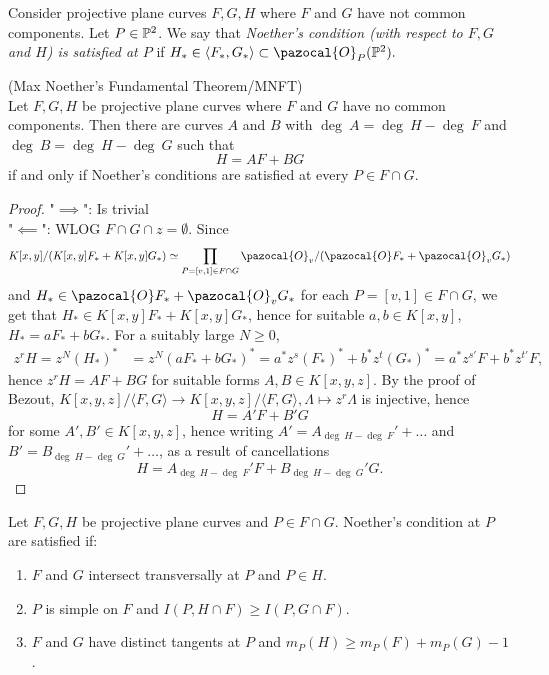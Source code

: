     \begin{definition}
        Consider projective plane curves $F,G,H$ where $F$ and $G$ have not common components. Let $P\in\mathbb{P}^2$. We say that \textit{Noether's condition (with respect to $F,G$ and $H$) is satisfied at $P$} if $H_\ast \in \langle F_\ast,G_\ast\rangle \subset \pazocal{O}_P(\Pp^2).$
    \end{definition}
    \begin{theorem}\label{MaxNoethersFundamentalTheorem}(Max Noether's Fundamental Theorem/MNFT)\\
        Let $F,G,H$ be projective plane curves where $F$ and $G$ have no common components. Then there are curves $A$ and $B$ with $\deg \ A = \deg \ H-\deg \ F$ and $\deg \ B = \deg \ H -\deg \ G$ such that 
        $$ H= AF+BG$$
        if and only if Noether's conditions are satisfied at every $P\in F\cap G$.
    \end{theorem}
    \begin{proof}
        "$\implies$": Is trivial\\
        "$\impliedby$": WLOG $F\cap G\cap z=\emptyset$. Since $$K[x,y]/(K[x,y]F_\ast+K[x,y]G_\ast)\simeq \prod_{P=[v,1]\in F\cap G} \pazocal{O}_v/(\pazocal{O}F_\ast+\pazocal{O}_vG_\ast)$$
        and $H_\ast\in \pazocal{O}F_\ast+\pazocal{O}_vG_\ast$ for each $P=[v,1]\in F\cap G$, we get that $H_\ast \in K[x,y]F_\ast+K[x,y]G_\ast$, hence for suitable $a,b\in K[x,y]$, $H_\ast = aF_\ast+bG_\ast$. For a suitably large $N\geq 0$,
        \begin{align*} 
            z^rH=z^N(H_\ast)^\ast &= z^N(aF_\ast+bG_\ast)^\ast = a^\ast z^s(F_\ast)^\ast+b^\ast z^t (G_\ast)^\ast = a^\ast z^{s'}F+b^\ast z^{t'}F,
        \end{align*}
        hence $z^rH=AF+BG$ for suitable forms $A,B\in K[x,y,z]$. By the proof of Bezout, $K[x,y,z]/\langle F,G\rangle \rightarrow K[x,y,z]/\langle F,G\rangle, \Lambda\mapsto z^r\Lambda $ is injective, hence 
        $$H= A'F+B'G$$
        for some $A',B'\in K[x,y,z]$, hence writing $A' = A_{\deg \ H- \deg \ F}'+\dots$ and $B' =B_{\deg \ H- \deg \ G}'+\dots$, as a result of cancellations
        $$H= A_{\deg \ H- \deg \ F}'F+B_{\deg \ H- \deg \ G}'G.$$
    \end{proof}
    \begin{proposition}\label{SufficientConditionsForNoethersCondition}
        Let $F,G,H$ be projective plane curves and $P\in F\cap G$. Noether's condition at $P$ are satisfied if:
        \begin{enumerate}
            \item $F$ and $G$ intersect transversally at $P$ and $P\in H$. 
            \item $P$ is simple on $F$ and $I(P,H\cap F)\geq I(P,G\cap F)$.
            \item $F$ and $G$ have distinct tangents at $P$ and $m_P(H)\geq m_P(F)+m_P(G)-1$.
        \end{enumerate}
    \end{proposition}
